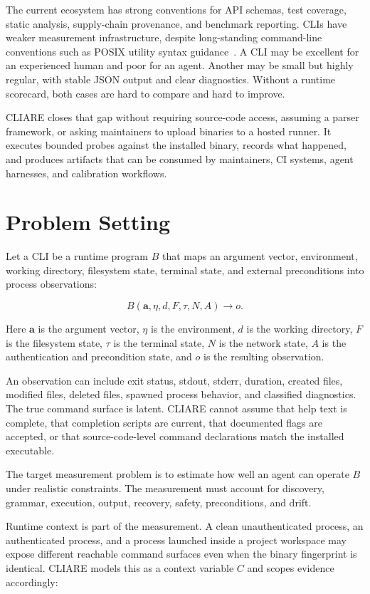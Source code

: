 \documentclass[11pt]{article}
\begin{document}
The current ecosystem has strong conventions for API schemas, test coverage, static analysis, supply-chain provenance, and benchmark reporting. CLIs have weaker measurement infrastructure, despite long-standing command-line conventions such as POSIX utility syntax guidance~\cite{posix-utility}. A CLI may be excellent for an experienced human and poor for an agent. Another may be small but highly regular, with stable JSON output and clear diagnostics. Without a runtime scorecard, both cases are hard to compare and hard to improve.

CLIARE closes that gap without requiring source-code access, assuming a parser framework, or asking maintainers to upload binaries to a hosted runner. It executes bounded probes against the installed binary, records what happened, and produces artifacts that can be consumed by maintainers, CI systems, agent harnesses, and calibration workflows.

\section{Problem Setting}

Let a CLI be a runtime program \(B\) that maps an argument vector, environment, working directory, filesystem state, terminal state, and external preconditions into process observations:

\[
B(\mathbf{a}, \eta, d, F, \tau, N, A) \rightarrow o .
\]

Here \(\mathbf{a}\) is the argument vector, \(\eta\) is the environment, \(d\) is the working directory, \(F\) is the filesystem state, \(\tau\) is the terminal state, \(N\) is the network state, \(A\) is the authentication and precondition state, and \(o\) is the resulting observation.

An observation can include exit status, stdout, stderr, duration, created files, modified files, deleted files, spawned process behavior, and classified diagnostics. The true command surface is latent. CLIARE cannot assume that help text is complete, that completion scripts are current, that documented flags are accepted, or that source-code-level command declarations match the installed executable.

The target measurement problem is to estimate how well an agent can operate \(B\) under realistic constraints. The measurement must account for discovery, grammar, execution, output, recovery, safety, preconditions, and drift.

Runtime context is part of the measurement. A clean unauthenticated process, an authenticated process, and a process launched inside a project workspace may expose different reachable command surfaces even when the binary fingerprint is identical. CLIARE models this as a context variable \(C\) and scopes evidence accordingly:
\end{document}
